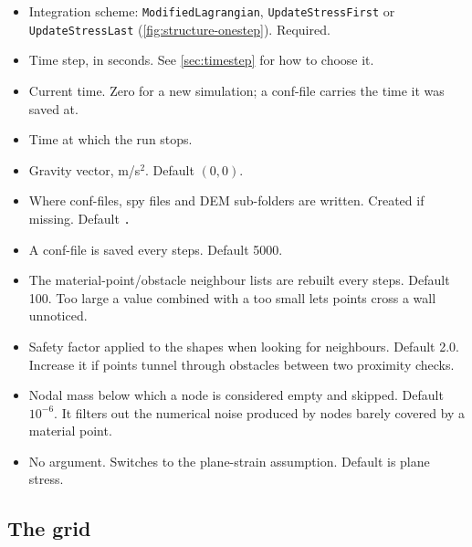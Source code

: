 \documentclass[a4paper,onecolumn,11pt]{doofus}
\begin{document}
\begin{itemize}
\item {} Integration scheme:
      \texttt{ModifiedLagrangian}, \texttt{UpdateStressFirst} or \texttt{UpdateStressLast}
      (\cref{fig:structure-onestep}). Required.
\item {} Time step, in seconds. See
      \cref{sec:timestep} for how to choose it.
\item {} Current time. Zero for a new
      simulation; a conf-file carries the time it was saved at.
\item {} Time at which the run stops.
\item {} Gravity vector, m/s$^2$. Default
      $(0,0)$.
\item {} Where conf-files, spy files
      and DEM sub-folders are written. Created if missing. Default \texttt{.}
\item {} A conf-file is saved every 
      steps. Default 5000.
\item {} The material-point/obstacle neighbour
      lists are rebuilt every  steps. Default 100. Too large a value combined with a
      too small  lets points cross a wall unnoticed.
\item {} Safety factor applied to
      the shapes when looking for neighbours. Default 2.0. Increase it if points tunnel through
      obstacles between two proximity checks.
\item {} Nodal mass below which a node is
      considered empty and skipped. Default $10^{-6}$. It filters out the numerical noise
      produced by nodes barely covered by a material point.
\item {} No argument. Switches to the plane-strain assumption.
      Default is plane stress.
\end{itemize}

\subsection{The grid}
\label{sec:grid}
\end{document}
